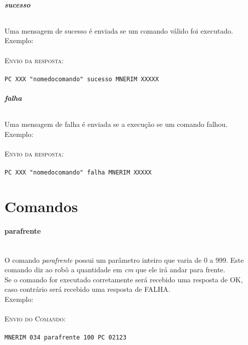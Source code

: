 \documentclass[11pt,	 papera4]{article}
\begin{document}
\paragraph{\textbf{sucesso} \newline \newline}

Uma mensagem de sucesso é enviada se um comando válido foi executado. 
\newline
Exemplo:\\\\ \hspace*{0.5cm} 
\textsc{Envio da resposta:} \\\\ \hspace*{2cm} \texttt{PC XXX "nomedocomando" sucesso MNERIM XXXXX} \\

\paragraph{\textbf{falha} \newline \newline}

Uma mensagem de falha é enviada se a execução se um comando falhou.
Exemplo:\\\\ \hspace*{0.5cm} 
\textsc{Envio da resposta:} \\\\ \hspace*{2cm} \texttt{PC XXX "nomedocomando" falha MNERIM XXXXX} \\

\newpage

\part*{Comandos \newline}


\subsection*{parafrente \\\\}
O comando \textit{parafrente} possui um parâmetro inteiro que varia de 0 a 999.  
Este comando diz ao robô a quantidade em \textit{cm} que ele irá andar para frente.\\
Se o comando for executado corretamente será recebido uma resposta de OK, caso contrário será recebido uma resposta de FALHA. \\ 
\newline
 Exemplo:\\\\ \hspace*{0.5cm} 
\textsc{Envio do Comando:} \\\\ \hspace*{2cm} \texttt{MNERIM 034 parafrente 100 PC 02123} \\
\end{document}
